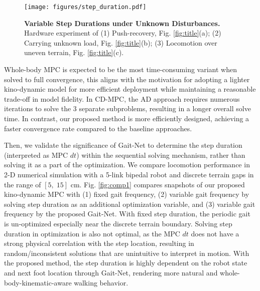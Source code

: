 \begin{figure}[!t]
\vspace{0.2cm}
    \center
    \texttt{[image: figures/step\_duration.pdf]}
    \caption{{\bfseries Variable Step Durations under Unknown Disturbances.} Hardware experiment of (1) Push-recovery, Fig. \ref{fig:title}(a); (2) Carrying unknown load, Fig. \ref{fig:title}(b); (3) Locomotion over uneven terrain, Fig. \ref{fig:title}(c).}
    \label{fig:disturbance}
    \vspace{-0.2cm}
\end{figure}

Whole-body MPC is expected to be the most time-consuming variant when solved to full convergence, this aligns with the motivation for adopting a lighter kino-dynamic model for more efficient deployment while maintaining a reasonable trade-off in model fidelity. In CD-MPC, the AD approach requires numerous iterations to solve the 3 separate subproblems, resulting in a longer overall solve time. In contrast, our proposed method is more efficiently designed, achieving a faster convergence rate compared to the baseline approaches.

Then, we validate the significance of Gait-Net to determine the step duration (interpreted as MPC $dt$) within the sequential solving mechanism, rather than solving it as a part of the optimization. We compare locomotion performance in 2-D numerical simulation with a 5-link bipedal robot and discrete terrain gaps in the range of $[5,\;15]$ cm. Fig. \ref{fig:comp1} compares snapshots of our proposed kino-dynamic MPC with (1) fixed gait frequency, (2) variable gait frequency by solving step duration as an additional optimization variable, and (3) variable gait frequency by the proposed Gait-Net. With fixed step duration, the periodic gait is un-optimized especially near the discrete terrain boundary. Solving step duration in optimization is also not optimal, as the MPC $dt$ does not have a strong physical correlation with the step location, resulting in random/inconsistent solutions that are unintuitive to interpret in motion. With the proposed method, the step duration is highly dependent on the robot state and next foot location through Gait-Net, rendering more natural and whole-body-kinematic-aware walking behavior.

